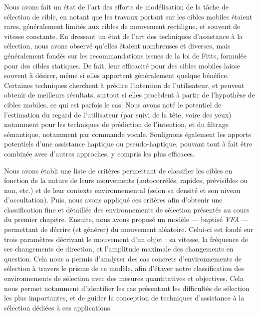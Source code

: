 	Nous avons fait un état de l'art des efforts de modélisation de la tâche de sélection de cible, en notant que les travaux portant sur les cibles mobiles étaient rares, généralement limités aux cibles de mouvement rectiligne, et souvent de vitesse constante. En dressant un état de l'art des techniques d'assistance à la sélection, nous avons observé qu'elles étaient nombreuses et diverses, mais généralement fondés sur les recommandations issues de la loi de Fitts, formulée pour des cibles statiques. De fait, leur efficacité pour des cibles mobiles laisse souvent à désirer, même si elles apportent généralement quelque bénéfice. Certaines techniques cherchent à prédire l'intention de l'utilisateur, et peuvent obtenir de meilleurs résultats, surtout si elles procèdent à partir de l'hypothèse de cibles mobiles, ce qui est parfois le cas. Nous avons noté le potentiel de l'estimation du regard de l'utilisateur (par suivi de la tête, voire des yeux) notamment pour les techniques de prédiction de l'intention, et du filtrage sémantique, notamment par commande vocale. Soulignons également les apports potentiels d'une assistance haptique ou pseudo-haptique, pouvant tout à fait être combinée avec d'autres approches, y compris les plus efficaces.
	
	Nous avons établi une liste de critères permettant de classifier les cibles en fonction de la nature de leurs mouvements (autocorrélés, rapides, prévisibles ou non, etc.) et de leur contexte environnemental (selon sa densité et son niveau d'occultation). Puis, nous avons appliqué ces critères afin d'obtenir une classification fine et détaillée des environnements de sélection présentés au cours du premier chapitre. Ensuite, nous avons proposé un modèle --- baptisé \emph{VFA} --- permettant de décrire (et générer) du mouvement aléatoire. Celui-ci est fondé sur trois paramètres décrivant le mouvement d'un objet : sa vitesse, la fréquence de ses changements de direction, et l'amplitude maximale des changements en question. Cela nous a permis d'analyser des cas concrets d'environnements de sélection à travers le prisme de ce modèle, afin d'étayer notre classification des environnements de sélection avec des mesures quantitatives et objectives. Cela nous permet notamment d'identifier les cas présentant les difficultés de sélection les plus importantes, et de guider la conception de techniques d'assistance à la sélection dédiées à ces applications.
	
